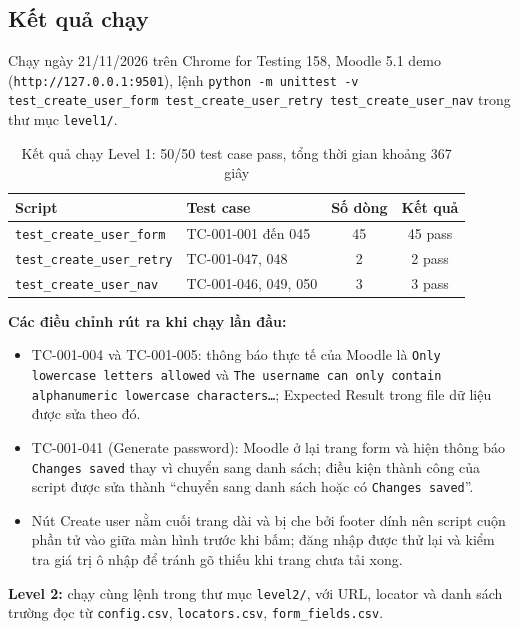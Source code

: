 \documentclass[12pt,a4paper]{article}
\begin{document}
\subsection{Kết quả chạy}
Chạy ngày 21/11/2026 trên Chrome for Testing 158, Moodle 5.1 demo (\texttt{http://127.0.0.1:9501}), lệnh
\texttt{python -m unittest -v test\_create\_user\_form test\_create\_user\_retry test\_create\_user\_nav} trong thư mục \texttt{level1/}.

\begin{table}[H]
\centering\small
\begin{tabular}{|L{5.0cm}|L{3.6cm}|c|c|}
\hline
{}\textbf{Script} & \textbf{Test case} & \textbf{Số dòng} & \textbf{Kết quả} \\ \hline
\texttt{test\_create\_user\_form} & TC-001-001 đến 045 & 45 & 45 pass \\ \hline
\texttt{test\_create\_user\_retry} & TC-001-047, 048 & 2 & 2 pass \\ \hline
\texttt{test\_create\_user\_nav} & TC-001-046, 049, 050 & 3 & 3 pass \\ \hline
\end{tabular}
\caption{Kết quả chạy Level 1: 50/50 test case pass, tổng thời gian khoảng 367 giây}
\end{table}

\textbf{Các điều chỉnh rút ra khi chạy lần đầu:}
\begin{itemize}[noitemsep]
  \item TC-001-004 và TC-001-005: thông báo thực tế của Moodle là \texttt{Only lowercase letters allowed} và \texttt{The username can only contain alphanumeric lowercase characters\ldots}; Expected Result trong file dữ liệu được sửa theo đó.
  \item TC-001-041 (Generate password): Moodle ở lại trang form và hiện thông báo \texttt{Changes saved} thay vì chuyển sang danh sách; điều kiện thành công của script được sửa thành ``chuyển sang danh sách hoặc có \texttt{Changes saved}''.
  \item Nút Create user nằm cuối trang dài và bị che bởi footer dính nên script cuộn phần tử vào giữa màn hình trước khi bấm; đăng nhập được thử lại và kiểm tra giá trị ô nhập để tránh gõ thiếu khi trang chưa tải xong.
\end{itemize}
\textbf{Level 2:} chạy cùng lệnh trong thư mục \texttt{level2/}, với URL, locator và danh sách trường đọc từ \texttt{config.csv}, \texttt{locators.csv}, \texttt{form\_fields.csv}.
\end{document}
